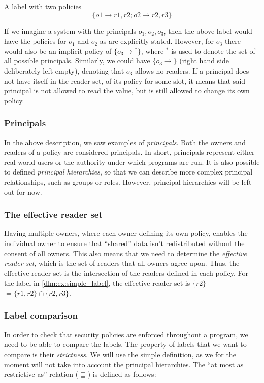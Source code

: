 \begin{example}{A label with two policies}\label{dlm:ex:simple_label}
  \[\{o1 \rightarrow r1, r2; o2 \rightarrow r2, r3\}\]
\end{example}

If we imagine a system with the principals $o_1, o_2, o_3$, then the above label would have the policies for $o_1$ and $o_2$ as are explicitly stated.
However, for $o_3$ there would also be an implicit policy of $\{o_3 \rightarrow {}^*\}$, where ${}^*$ is used to denote the set of all possible principals.
Similarly, we could have $\{o_3 \rightarrow \}$ (right hand side deliberately left empty), denoting that $o_3$ allows no readers.
If a principal does not have itself in the reader set, of its policy for some slot, it means that said principal is not allowed to read the value, but is still allowed to change its own policy.

\subsubsection{Principals}
In the above description, we saw examples of \emph{principals}.
Both the owners and readers of a policy are considered principals.
In short, principals represent either real-world users or the authority under which programs are run.
It is also possible to defined \emph{principal hierarchies}, so that we can describe more complex principal relationships, such as groups or roles.
However, principal hierarchies will be left out for now.

\subsubsection{The effective reader set}
Having multiple owners, where each owner defining its own policy, enables the individual owner to ensure that ``shared'' data isn't redistributed without the consent of all owners.
This also means that we need to determine the \emph{effective reader set}, which is the set of readers that all owners agree upon.
Thus, the effective reader set is the intersection of the readers defined in each policy.
For the label in \cref{dlm:ex:simple_label}, the effective reader set is $\{r2\}$ $= \{r1,r2\} \cap \{r2, r3\}$.

\subsubsection{Label comparison}
In order to check that security policies are enforced throughout a program, we need to be able to compare the labels.
The property of labels that we want to compare is their \emph{strictness}.
We will use the simple definition\cite{myers1997}, as we for the moment will not take into account the principal hierarchies.
The ``at most as restrictive as''-relation ($\sqsubseteq$) is defined as follows:

